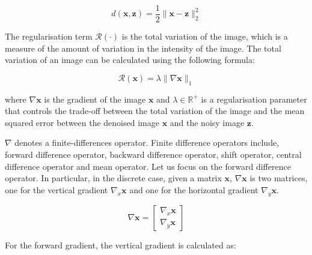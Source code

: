 \documentclass[12pt]{article}
\begin{document}
\begin{equation}
  d(\mathbf{x}, \mathbf{z}) = \frac{1}{2} \|\mathbf{x} - \mathbf{z}\|_2^2
\end{equation}

The regularisation term $\mathcal{R}(\cdot)$ is the total variation of the image, which is a measure of the amount of variation in the intensity of the image. The total variation of an image can be calculated using the following formula:

\begin{equation}
  \mathcal{R}(\mathbf{x}) = \lambda \| \nabla \mathbf{x} \|_1
\end{equation}

where $\nabla \mathbf{x}$ is the gradient of the image $\mathbf{x}$ and $\lambda \in \mathbb{R}^{+}$ is a regularisation parameter that controls the trade-off between the total variation of the image and the mean squared error between the denoised image $\mathbf{x}$ and the noisy image $\mathbf{z}$.



$\nabla$ denotes a finite-differences operator.
Finite difference operators include, forward difference operator,
backward difference operator, shift operator, central difference operator and mean operator.
Let us focus on the forward difference operator. In particular, in the discrete case, given a matrix $\mathbf{x}$, $\nabla \mathbf{x}$ is two matrices, one for the vertical gradient $\nabla_{x} \mathbf{x}$ and one for the horizontal gradient $\nabla_{y} \mathbf{x}$.


\begin{equation}
  \nabla \mathbf{x} = \begin{bmatrix}
    \nabla_{x} \mathbf{x} \\
    \nabla_{y} \mathbf{x}
  \end{bmatrix}
\end{equation}



For the forward gradient, the vertical gradient is calculated as:
\end{document}

